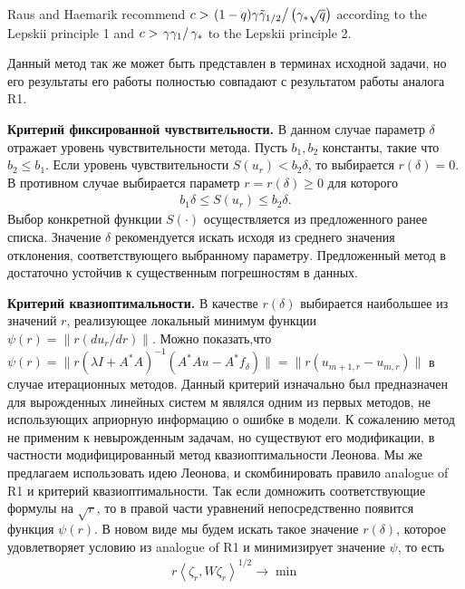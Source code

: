 \documentclass[10pt]{article}
\theoremstyle{definition}
\theoremstyle{remark}
\theoremstyle{plain}
\newcommand{\scalar}[2]{\left<#1,#2\right>}
\begin{document}
Raus and Haemarik recommend 
$c>\left.(1-q)\gamma\tilde{\gamma}_{1/2}\right/\left(\gamma_* \sqrt{q}\right)$
according to the Lepskii principle 1 and 
$c>\left.\gamma\gamma_1\right/\gamma_*$
to the Lepskii principle 2.

Данный метод так же может быть представлен в терминах исходной задачи, но его результаты его работы полностью совпадают с результатом работы аналога R1. 


\textbf{Критерий фиксированной чувствительности.}
В данном случае параметр $\delta$ отражает уровень чувствительности метода.
Пусть $b_1,b_2$ константы, такие что $b_2\leqslant b_1$. Если уровень чувствительности $S(u_r)<b_2\delta$, то выбирается $r(\delta) =0 $. В противном случае выбирается параметр  $r = r(\delta)\geqslant 0$ для которого
\begin{align}
b_1 \delta\leqslant S(u_r)\leqslant b_2\delta.
\end{align}
Выбор конкретной функции $S(\cdot)$ осуществляется из предложенного ранее списка. Значение $\delta$ рекомендуется искать исходя из среднего значения отклонения, соответствующего выбранному параметру. Предложенный метод в достаточно устойчив к существенным погрешностям в данных. 

\textbf{Критерий квазиоптимальности.}
В качестве $r(\delta)$ выбирается наибольшее из значений $r$, реализующее локальный минимум функции $\psi(r) = \|r(du_r/dr)\|$. Можно показать,что $\psi(r) = \|r(\lambda I+A^*A)^{-1}(A^*Au - A^*f_\delta)\| = \|r(u_{m+1,r} - u_{m,r})\|$ в случае итерационных методов.
Данный критерий изначально был предназначен для вырожденных линейных систем м являлся одним из первых методов, не использующих априорную информацию о ошибке в модели. К сожалению метод не применим к невырожденным задачам, но существуют его модификации, в частности модифицированный метод квазиоптимальности Леонова. Мы же предлагаем использовать идею Леонова, и скомбинировать правило analogue of R1 и критерий квазиоптимальности. Так если домножить соответствующие формулы на $\sqrt{r}$, то в правой части уравнений непосредственно появится функция $\psi(r)$. В новом виде мы будем искать такое значение $r(\delta)$, которое удовлетворяет условию из analogue of R1 и минимизирует значение $\psi$, то есть
\begin{align}
r\scalar{\zeta_r}{W\zeta_r}^{1/2} \rightarrow \min
\end{align}
\end{document}
